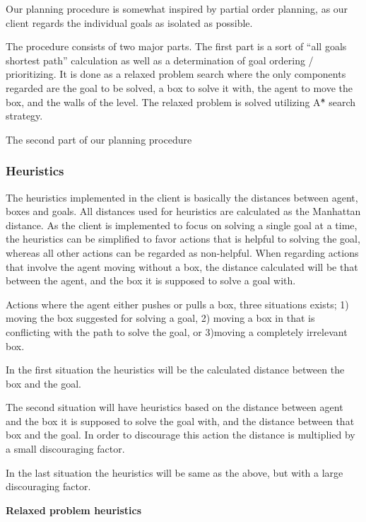 \documentclass[Main]{subfiles}
\begin{document}
Our planning procedure is somewhat inspired by partial order planning, as our client regards the individual goals as isolated as possible. 

The procedure consists of two major parts. The first part is a sort of ``all goals shortest path'' calculation as well as a determination of goal ordering / prioritizing. 
It is done as a relaxed problem search where the only components regarded are the goal to be solved, a box to solve it with, the agent to move the box, and the walls of the level. The relaxed problem is solved utilizing A\^{*} search strategy. 

The second part of our planning procedure  




\subsubsection{Heuristics}
\label{sec:method_heuristics}
The heuristics implemented in the client is basically the distances between agent, boxes and goals. All distances used for heuristics are calculated as the Manhattan distance.  As the client is implemented to focus on solving a single goal at a time, the heuristics can be simplified to favor actions that is helpful to solving the goal, whereas all other actions can be regarded as non-helpful. 
When regarding actions that involve the agent moving without a box, the distance calculated will be that between the agent, and the box it is supposed to solve a goal with. 

Actions where the agent either pushes or pulls a box, three situations exists; 1) moving the box suggested for solving a goal, 2) moving a box in that is conflicting with the path to solve the goal, or 3)moving a completely irrelevant box. 

In the first situation the heuristics will be the calculated distance between the box and the goal.

The second situation will have heuristics based on the distance between agent and the box it is supposed to solve the goal with, and the distance between that box and the goal. In order to discourage this action the distance is multiplied by a small discouraging factor.

In the last situation the heuristics will be same as the above, but with a large discouraging factor. 


\textbf{Relaxed problem heuristics}
\end{document}
